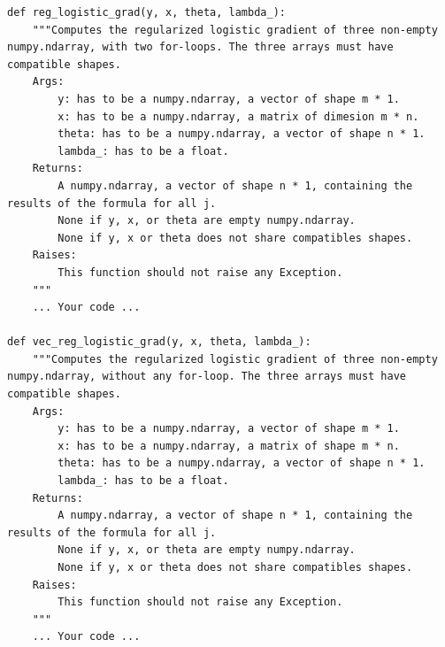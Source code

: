 \documentclass{42-en}
\begin{document}
\begin{verbatim}
def reg_logistic_grad(y, x, theta, lambda_):
	"""Computes the regularized logistic gradient of three non-empty numpy.ndarray, with two for-loops. The three arrays must have compatible shapes.
	Args:
		y: has to be a numpy.ndarray, a vector of shape m * 1.
		x: has to be a numpy.ndarray, a matrix of dimesion m * n.
		theta: has to be a numpy.ndarray, a vector of shape n * 1.
		lambda_: has to be a float.
	Returns:
		A numpy.ndarray, a vector of shape n * 1, containing the results of the formula for all j.
		None if y, x, or theta are empty numpy.ndarray.
		None if y, x or theta does not share compatibles shapes.
	Raises:
		This function should not raise any Exception.
	"""
	... Your code ...

def vec_reg_logistic_grad(y, x, theta, lambda_):
	"""Computes the regularized logistic gradient of three non-empty numpy.ndarray, without any for-loop. The three arrays must have compatible shapes.
	Args:
		y: has to be a numpy.ndarray, a vector of shape m * 1.
		x: has to be a numpy.ndarray, a matrix of shape m * n.
		theta: has to be a numpy.ndarray, a vector of shape n * 1.
		lambda_: has to be a float.
	Returns:
		A numpy.ndarray, a vector of shape n * 1, containing the results of the formula for all j.
		None if y, x, or theta are empty numpy.ndarray.
		None if y, x or theta does not share compatibles shapes.
	Raises:
		This function should not raise any Exception.
	"""
	... Your code ...
\end{verbatim}


\end{document}
